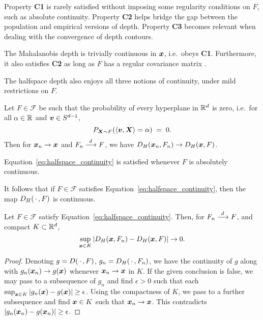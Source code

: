 Property \textbf{C1} is rarely satisfied without imposing some regularity
conditions on $F$, such as absolute continuity.
Property \textbf{C2} helps bridge the gap between the population and empirical
versions of depth.
Property \textbf{C3} becomes relevant when dealing with the convergence of
depth contours.


The Mahalanobis depth is trivially continuous in $\bm{x}$, i.e.\ obeys
\textbf{C1}.
Furthermore, it also satisfies \textbf{C2} as long as $F$ has a regular
covariance matrix \parencite{mosler-mozharovskyi-2022}.


The halfspace depth also enjoys all three notions of continuity, under mild
restrictions on $F$.

\begin{theorem}
    Let $F \in \mathscr{F}$ be such that the probability of every hyperplane
    in $\mathbb{R}^d$ is zero, i.e.\ for all $\alpha \in \mathbb{R}$ and $\bm{v} \in S^{d - 1}$,
    \begin{equation}
        P_{\bm{X} \sim F}(\langle \bm{v}, \bm{X} \rangle = \alpha) \;=\; 0. \label{eq:halfspace_continuity}
    \end{equation}
    Then for $\bm{x}_n \to \bm{x}$ and $F_n \overset{d\,}{\longrightarrow} F$, we have $D_H(\bm{x}_n, F_n) \to
    D_H(\bm{x}, F)$.
\end{theorem}
\begin{remark}
    Equation~\ref{eq:halfspace_continuity} is satisfied whenever $F$ is
    absolutely continuous.
\end{remark}
\begin{remark}
    It follows that if $F \in \mathscr{F}$ satisfies
    Equation~\ref{eq:halfspace_continuity}, then the map $D_H(\,\cdot\,, F)$ is
    continuous.
\end{remark}

\begin{corollary}
    Let $F \in \mathscr{F}$ satisfy Equation~\ref{eq:halfspace_continuity}.
    Then, for $F_n \overset{d\,}{\longrightarrow} F$, and compact $K \subset \mathbb{R}^d$,
    \begin{equation}
        \sup_{\bm{x} \in K} |D_H(\bm{x}, F_n) - D_H(\bm{x}, F)| \to 0.
    \end{equation}
\end{corollary}
\begin{proof}
    Denoting $g = D(\,\cdot\,, F)$, $g_n = D_H(\,\cdot\,, F_n)$, we have the
    continuity of $g$ along with $g_n(\bm{x}_n) \to g(\bm{x})$ whenever $\bm{x}_n \to
    \bm{x}$ in $K$.
    If the given conclusion is false, we may pass to a subsequence of $g_n$
    and find $\epsilon > 0$ such that each $\sup_{\bm{x} \in K} |g_n(\bm{x}) -
    g(\bm{x})| \geq \epsilon$.
    Using the compactness of $K$, we pass to a further subsequence and find
    $\bm{x} \in K$ such that $\bm{x}_n \to \bm{x}$.
    This contradicts $|g_n(\bm{x}_n) - g(\bm{x}_n)| \geq \epsilon$.
\end{proof}

